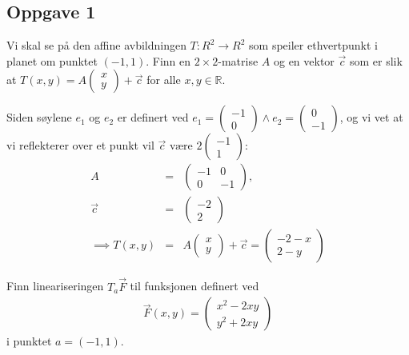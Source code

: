 \documentclass{../../myassignment}
\begin{document}
	\subsection*{Oppgave 1}
		\begin{problem}
			Vi skal se på den affine avbildningen $T: R^2 \to R^2$ som speiler ethvertpunkt i planet om punktet $(-1, 1)$. Finn en $2 \times 2$-matrise $A$ og en vektor $\vec{c}$ som er slik at $T(x,y) = A \begin{pmatrix}x\\y\end{pmatrix} + \vec{c}$ for alle $x,y \in \mathbb{R}$.
		\end{problem}
	
		\begin{answer}
			Siden s{\o}ylene $e_1$ og $e_2$ er definert ved $e_1 = \begin{pmatrix} -1 \\ 0 \end{pmatrix} \land e_2 = \begin{pmatrix} 0 \\ -1 \end{pmatrix}$, og vi vet at vi reflekterer over et punkt vil $\vec{c}$ v{\ae}re $2\begin{pmatrix} -1 \\ 1 \end{pmatrix}$:
			\begin{eqnarray*}
				A &=& \begin{pmatrix} -1 & 0 \\ 0 & -1 \end{pmatrix},\\
				\vec{c} &=& \begin{pmatrix} -2 \\ 2 \end{pmatrix}\\
				\implies
				T(x,y) &=& A\begin{pmatrix}x\\y\end{pmatrix} + \vec{c} = \begin{pmatrix} -2-x \\ 2-y \end{pmatrix}
			\end{eqnarray*}
		\end{answer}

		\newpage

		\begin{problem}
			Finn lineariseringen $T_a \vec{F}$ til funksjonen definert ved 
				\begin{eqnarray*}
					\vec{F}(x,y) = \begin{pmatrix}
						x^2-2xy \\
						y^2+2xy
					\end{pmatrix}
				\end{eqnarray*}
			i punktet $a=(-1,1)$.
		\end{problem}
\end{document}

